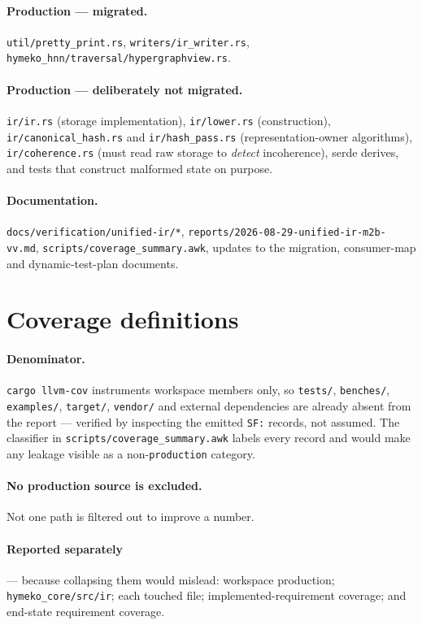 \documentclass[11pt,a4paper]{article}
\newcommand{\code}[1]{\texttt{#1}}
\begin{document}
\paragraph{Production --- migrated.} \code{util/pretty\_print.rs},
\code{writers/ir\_writer.rs}, \code{hymeko\_hnn/traversal/hypergraphview.rs}.

\paragraph{Production --- deliberately not migrated.} \code{ir/ir.rs} (storage
implementation), \code{ir/lower.rs} (construction), \code{ir/canonical\_hash.rs}
and \code{ir/hash\_pass.rs} (representation-owner algorithms),
\code{ir/coherence.rs} (must read raw storage to \emph{detect} incoherence),
serde derives, and tests that construct malformed state on purpose.

\paragraph{Documentation.} \code{docs/verification/unified-ir/*},
\code{reports/2026-08-29-unified-ir-m2b-vv.md},
\code{scripts/coverage\_summary.awk}, updates to the migration, consumer-map and
dynamic-test-plan documents.

\section{Coverage definitions}

\paragraph{Denominator.} \code{cargo llvm-cov} instruments workspace members
only, so \code{tests/}, \code{benches/}, \code{examples/}, \code{target/},
\code{vendor/} and external dependencies are already absent from the report ---
verified by inspecting the emitted \code{SF:} records, not assumed. The
classifier in \code{scripts/coverage\_summary.awk} labels every record and would
make any leakage visible as a non-\code{production} category.

\paragraph{No production source is excluded.} Not one path is filtered out to
improve a number.

\paragraph{Reported separately} --- because collapsing them would mislead:
workspace production; \code{hymeko\_core/src/ir}; each touched file;
implemented-requirement coverage; and end-state requirement coverage.
\end{document}

